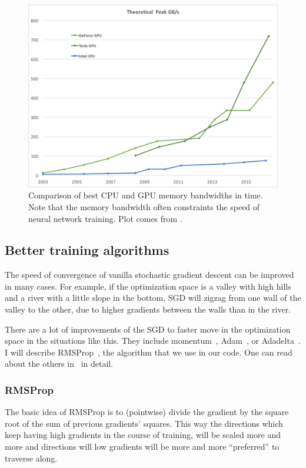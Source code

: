 \begin{figure}[h]
  \includegraphics[width=\linewidth]{images/gpu-bandwidth.png}
  \caption{Comparison of best CPU and GPU memory bandwidths in time. Note that the memory bandwidth often constraints the speed of neural network training. Plot comes from \cite{nvidia-docs}.}\label{nvidia-speed}
\end{figure}

\subsection{Better training algorithms}
The speed of convergence of vanilla stochastic gradient descent can be improved in many cases. For example, if the optimization space is a valley with high hills and a river with a little slope in the bottom, SGD will zigzag from one wall of the valley to the other, due to higher gradients between the walls than in the river.

There are a lot of improvements of the SGD to faster move in the optimization space in the situations like this. They include momentum~\cite{momentum}, Adam~\cite{adam}, or Adadelta~\cite{adadelta}. I will describe RMSProp~\cite{rmsprop}, the algorithm that we use in our code. One can read about the others in~\cite[chapter 8.3.]{dlbook} in detail.

\subsubsection{RMSProp}\label{rmsprop-section}
The basic idea of RMSProp is to (pointwise) divide the gradient by the square root of the sum of previous gradients' squares. This way the directions which keep having high gradients in the course of training, will be scaled more and more and directions will low gradients will be more and more ``preferred'' to traverse along.

